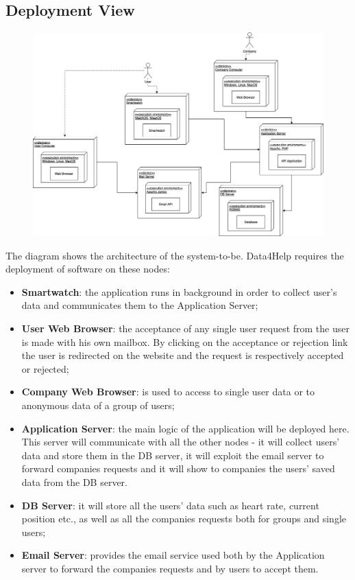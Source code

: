 \documentclass{article}
\begin{document}
\subsection{Deployment View}
\begin{figure}[h!]
\centering
    \textbf{}\par\medskip
	\includegraphics[width= \linewidth]{depl.png}
\end{figure}
The diagram shows the architecture of the system-to-be. Data4Help requires the deployment of software on these nodes:
\begin{itemize}
\item \textbf{Smartwatch}: the application runs in background in order to collect user's data and communicates them to the Application Server;
\item \textbf{User Web Browser}: the acceptance of any single user request from the user is made with his own mailbox. By clicking on the acceptance or rejection link the user is redirected on the website and the request is respectively accepted or rejected;
\item \textbf{Company Web Browser}: is used to access to single user data or to anonymous data of a group of users;
\item \textbf{Application Server}: the main logic of the application will be deployed here. This server will communicate with all the other nodes - it will collect users' data and store them in the DB server, it will exploit the email server to forward companies requests and it will show to companies the users' saved data from the DB server.
\item \textbf{DB Server}: it will store all the users' data such as heart rate, current position etc., as well as all the companies requests both for groups and single users;
\item \textbf{Email Server}: provides the email service used both by the Application server to forward the companies requests and by users to accept them.
\end{itemize}
\newpage
\end{document}
